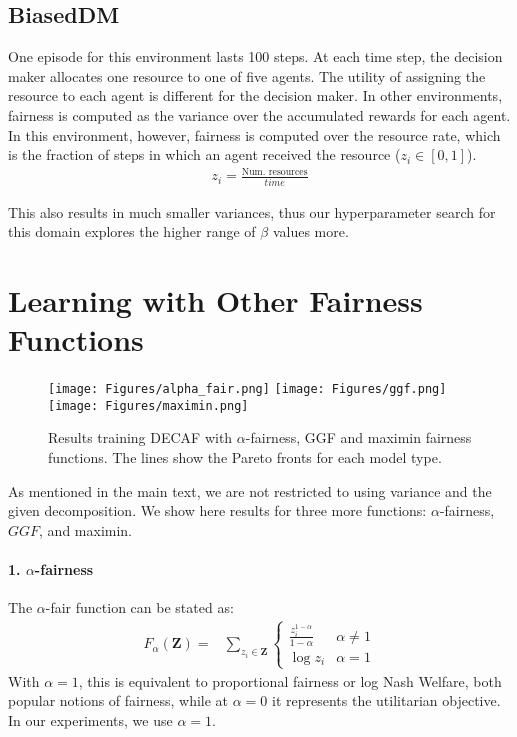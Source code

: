 \subsection{BiasedDM}
One episode for this environment lasts 100 steps. At each time step, the decision maker allocates one resource to one of five agents. The utility of assigning the resource to each agent is different for the decision maker. In other environments, fairness is computed as the variance over the accumulated rewards for each agent. In this environment, however, fairness is computed over the resource rate, which is the fraction of steps in which an agent received the resource ($z_i\in[0,1]$).
\begin{align}
    z_i = \frac{\text{Num. resources}}{time}
\end{align}

This also results in much smaller variances, thus our hyperparameter search for this domain explores the higher range of $\beta$ values more.


\section{Learning with Other Fairness Functions}
\begin{figure*}
    \centering
    \texttt{[image: Figures/alpha\_fair.png]}
    \texttt{[image: Figures/ggf.png]}
    \texttt{[image: Figures/maximin.png]}
    \caption{Results training DECAF with $\alpha$-fairness, GGF and maximin fairness functions. The lines show the Pareto fronts for each model type.}
    \label{fig:other_metrics}
\end{figure*}

As mentioned in the main text, we are not restricted to using variance and the given decomposition. We show here results for three more functions: $\alpha$-fairness, $GGF$, and  maximin.

\paragraph{1. \textbf{$\alpha$-fairness}}
The $\alpha$-fair function can be stated as:
\begin{align}
    F_\alpha(\textbf{Z}) =& \sum_{z_i\in\textbf{Z}}\begin{cases}
        \frac{z_i^{1-\alpha}}{1-\alpha} & \alpha\neq 1 \\
        \log z_i & \alpha=1
    \end{cases}
\end{align}
With $\alpha=1$, this is equivalent to proportional fairness or log Nash Welfare, both popular notions of fairness, while at $\alpha=0$ it represents the utilitarian objective. In our experiments, we use $\alpha=1$.

